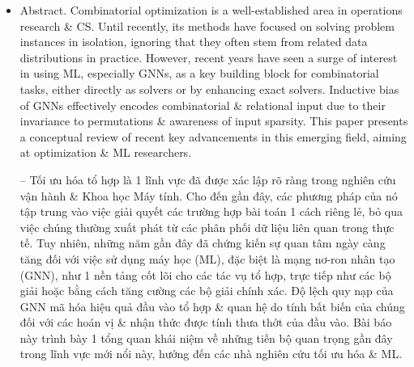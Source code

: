 \documentclass{article}
\begin{document}
\begin{itemize}
    \item {\sf Abstract.} Combinatorial optimization is a well-established area in operations research \& CS. Until recently, its methods have focused on solving problem instances in isolation, ignoring that they often stem from related data distributions in practice. However, recent years have seen a surge of interest in using ML, especially GNNs, as a key building block for combinatorial tasks, either directly as solvers or by enhancing exact solvers. Inductive bias of GNNs effectively encodes combinatorial \& relational input due to their invariance to permutations \& awareness of input sparsity. This paper presents a conceptual review of recent key advancements in this emerging field, aiming at optimization \& ML researchers.

    -- Tối ưu hóa tổ hợp là 1 lĩnh vực đã được xác lập rõ ràng trong nghiên cứu vận hành \& Khoa học Máy tính. Cho đến gần đây, các phương pháp của nó tập trung vào việc giải quyết các trường hợp bài toán 1 cách riêng lẻ, bỏ qua việc chúng thường xuất phát từ các phân phối dữ liệu liên quan trong thực tế. Tuy nhiên, những năm gần đây đã chứng kiến sự quan tâm ngày càng tăng đối với việc sử dụng máy học (ML), đặc biệt là mạng nơ-ron nhân tạo (GNN), như 1 nền tảng cốt lõi cho các tác vụ tổ hợp, trực tiếp như các bộ giải hoặc bằng cách tăng cường các bộ giải chính xác. Độ lệch quy nạp của GNN mã hóa hiệu quả đầu vào tổ hợp \& quan hệ do tính bất biến của chúng đối với các hoán vị \& nhận thức được tính thưa thớt của đầu vào. Bài báo này trình bày 1 tổng quan khái niệm về những tiến bộ quan trọng gần đây trong lĩnh vực mới nổi này, hướng đến các nhà nghiên cứu tối ưu hóa \& ML.


\end{itemize}
\end{document}
